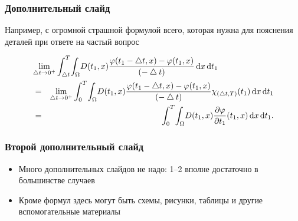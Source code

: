 \documentclass{beamer}
\begin{document}
\appendix

\begin{frame}
  \frametitle{Дополнительный слайд}
  Например, с огромной страшной формулой всего, которая нужна для пояснения деталей при ответе на частый вопрос
  
\begin{eqnarray*}
\lefteqn{
\lim_{\bigtriangleup t \to 0^+}\int_{\bigtriangleup t}^{T} \! \int_{\Omega} \! D(t_1,x) \frac{\varphi(t_1-\bigtriangleup t,x)-\varphi(t_1,x)}{(-\bigtriangleup t)} \, \mathrm{d}x \, \mathrm{d}t_1 
}\\
&=&\lim_{\bigtriangleup t \to 0^+} \int_{0}^{T} \! \int_{\Omega} \! D(t_1,x) \frac{\varphi(t_1-\bigtriangleup t,x)-\varphi(t_1,x)}{(-\bigtriangleup t)} \chi_{(\bigtriangleup t,T)}(t_1) \, \mathrm{d}x \, \mathrm{d}t_1 
\\
&= &\int_{0}^{T} \! \int_{\Omega} \! D(t_1,x) \frac{\partial \varphi}{\partial t_1} (t_1,x) \, \mathrm{d}x \, \mathrm{d}t_1 .
\end{eqnarray*}
\end{frame}

\begin{frame}
  \frametitle{Второй дополнительный слайд}
\begin{itemize}
  \item Много дополнительных слайдов не надо: 1--2 вполне достаточно в большинстве случаев
  \item Кроме формул здесь могут быть схемы, рисунки, таблицы и другие вспомогательные материалы
\end{itemize}

  
\end{frame}
\end{document}
